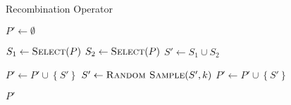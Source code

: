 \begin{algorithm}
  \caption{Recombination Operator}\label{alg:GENETIKUS-ALGORITMUS:REPRODUKCIO}
  \begin{algorithmic}[1]
    \State $P' \leftarrow \emptyset$

    \State $S_{1} \leftarrow \Call{Select}{P}$
    \State $S_{2} \leftarrow \Call{Select}{P}$
    \State $S' \leftarrow S_{1} \cup S_{2}$

    \State $P' \leftarrow P' \cup \left\{ S' \right\}$
    \Else
    \State $S' \leftarrow \Call{Random Sample}{S', k}$
    \State $P' \leftarrow P' \cup \left\{ S' \right\}$
    \EndIf
    \EndFor

    \State \Return $P'$
    \EndFunction
  \end{algorithmic}
\end{algorithm}
